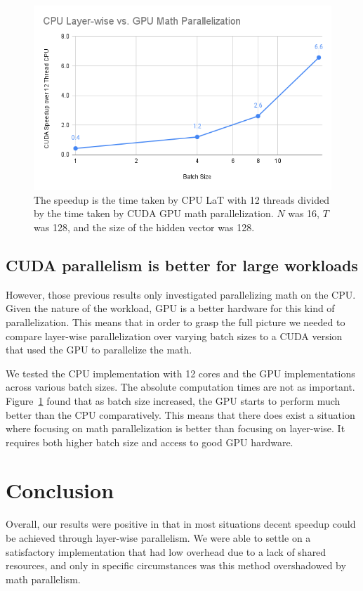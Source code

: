 \documentclass[12pt]{article}
\begin{document}
\begin{figure}
    \centering
    \includegraphics[width=15cm]{CPU Layer-wise vs. GPU Math Parallelization.png}
    \caption{The speedup is the time taken by CPU LaT with 12 threads divided by the time taken by CUDA GPU math parallelization. $N$ was 16, $T$ was 128, and the size of the hidden vector was 128.}
    \label{fig:cpu_versus_gpu}
\end{figure}

\subsection{CUDA parallelism is better for large workloads}
However, those previous results only investigated parallelizing math on the CPU.
Given the nature of the workload, GPU is a better hardware for this kind of parallelization.
This means that in order to grasp the full picture we needed to compare layer-wise parallelization over varying batch sizes to a CUDA version that used the GPU to parallelize the math.

We tested the CPU implementation with 12 cores and the GPU implementations across various batch sizes.
The absolute computation times are not as important.
Figure~\ref{fig:cpu_versus_gpu} found that as batch size increased, the GPU starts to perform much better than the CPU comparatively.
This means that there does exist a situation where focusing on math parallelization is better than focusing on layer-wise. It requires both higher batch size and access to good GPU hardware.

\section{Conclusion}
Overall, our results were positive in that in most situations decent speedup could be achieved through layer-wise parallelism. We were able to settle on a satisfactory implementation that had low overhead due to a lack of shared resources, and only in specific circumstances was this method overshadowed by math parallelism.
\end{document}
